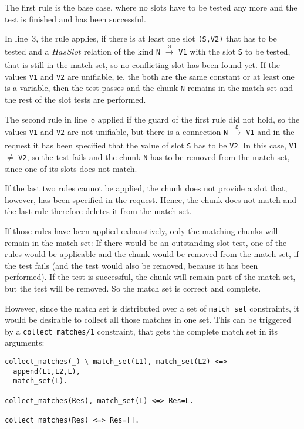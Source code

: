 The first rule is the base case, where no slots have to be tested any more and the test is finished and has been successful.

In line~3, the rule applies, if there is at least one slot \verb|(S,V2)| that has to be tested and a $HasSlot$ relation of the kind \verb|N| $\xrightarrow[]{\mathtt{S}}$ \verb|V1| with the slot \verb|S| to be tested, that is still in the match set, so no conflicting slot has been found yet. If the values \verb|V1| and \verb|V2| are unifiable, ie. the both are the same constant or at least one is a variable, then the test passes and the chunk \verb|N| remains in the match set and the rest of the slot tests are performed.

The second rule in line~8 applied if the guard of the first rule did not hold, so the values \verb|V1| and \verb|V2| are not unifiable, but there is a connection \verb|N| $\xrightarrow[]{\mathtt{S}}$ \verb|V1| and in the request it has been specified that the value of slot \verb|S| has to be \verb|V2|. In this case, \verb|V1| $\neq$ \verb|V2|, so the test fails and the chunk \verb|N| has to be removed from the match set, since one of its slots does not match.

If the last two rules cannot be applied, the chunk does not provide a slot that, however, has been specified in the request. Hence, the chunk does not match and the last rule therefore deletes it from the match set. 

If those rules have been applied exhaustively, only the matching chunks will remain in the match set: If there would be an outstanding slot test, one of the rules would be applicable and the chunk would be removed from the match set, if the test fails (and the test would also be removed, because it has been performed). If the test is successful, the chunk will remain part of the match set, but the test will be removed. So the match set is correct and complete.

However, since the match set is distributed over a set of \verb|match_set| constraints, it would be desirable to collect all those matches in one set. This can be triggered by a \verb|collect_matches/1| constraint, that gets the complete match set in its arguments:

\begin{lstlisting}
collect_matches(_) \ match_set(L1), match_set(L2) <=> 
  append(L1,L2,L), 
  match_set(L).
  
collect_matches(Res), match_set(L) <=> Res=L.

collect_matches(Res) <=> Res=[].
\end{lstlisting}

